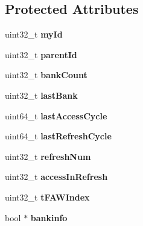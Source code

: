 \subsection*{Protected Attributes}
\begin{DoxyCompactItemize}
\item 
\hypertarget{classMemRankBase_a4b904ede9e32196cb5dcf34098029f01}{uint32\-\_\-t {\bfseries my\-Id}}\label{classMemRankBase_a4b904ede9e32196cb5dcf34098029f01}

\item 
\hypertarget{classMemRankBase_a5cb3737f7dfc01c334f7556646f3680a}{uint32\-\_\-t {\bfseries parent\-Id}}\label{classMemRankBase_a5cb3737f7dfc01c334f7556646f3680a}

\item 
\hypertarget{classMemRankBase_a17c1ad412fec857afc886e70d2cc7bbc}{uint32\-\_\-t {\bfseries bank\-Count}}\label{classMemRankBase_a17c1ad412fec857afc886e70d2cc7bbc}

\item 
\hypertarget{classMemRankBase_a381d1dd95e2577b15055ed7d8cdc258f}{uint32\-\_\-t {\bfseries last\-Bank}}\label{classMemRankBase_a381d1dd95e2577b15055ed7d8cdc258f}

\item 
\hypertarget{classMemRankBase_a328af2885e948b30f47cb4b7a24871eb}{uint64\-\_\-t {\bfseries last\-Access\-Cycle}}\label{classMemRankBase_a328af2885e948b30f47cb4b7a24871eb}

\item 
\hypertarget{classMemRankBase_a98b3bfc0bdd03e7193fc5f8ea5711d53}{uint64\-\_\-t {\bfseries last\-Refresh\-Cycle}}\label{classMemRankBase_a98b3bfc0bdd03e7193fc5f8ea5711d53}

\item 
\hypertarget{classMemRankBase_ab58cde59becf2491a58d30383cc72690}{uint32\-\_\-t {\bfseries refresh\-Num}}\label{classMemRankBase_ab58cde59becf2491a58d30383cc72690}

\item 
\hypertarget{classMemRankBase_a35d0773a1d81cdf96cd4f7b98777b694}{uint32\-\_\-t {\bfseries access\-In\-Refresh}}\label{classMemRankBase_a35d0773a1d81cdf96cd4f7b98777b694}

\item 
\hypertarget{classMemRankBase_ad10402fd62d14f85eded3334396d1fe2}{uint32\-\_\-t {\bfseries t\-F\-A\-W\-Index}}\label{classMemRankBase_ad10402fd62d14f85eded3334396d1fe2}

\item 
\hypertarget{classMemRankBase_a27213bb3cadac04866f19e0c449dc0f4}{bool $\ast$ {\bfseries bankinfo}}\label{classMemRankBase_a27213bb3cadac04866f19e0c449dc0f4}


\end{DoxyCompactItemize}
